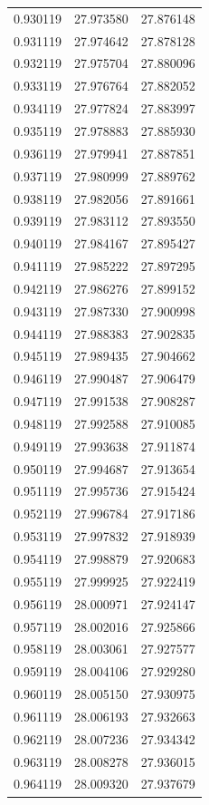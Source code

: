 \begin{tabular}{rrr}
0.930119 & 27.973580 & 27.876148 \\
0.931119 & 27.974642 & 27.878128 \\
0.932119 & 27.975704 & 27.880096 \\
0.933119 & 27.976764 & 27.882052 \\
0.934119 & 27.977824 & 27.883997 \\
0.935119 & 27.978883 & 27.885930 \\
0.936119 & 27.979941 & 27.887851 \\
0.937119 & 27.980999 & 27.889762 \\
0.938119 & 27.982056 & 27.891661 \\
0.939119 & 27.983112 & 27.893550 \\
0.940119 & 27.984167 & 27.895427 \\
0.941119 & 27.985222 & 27.897295 \\
0.942119 & 27.986276 & 27.899152 \\
0.943119 & 27.987330 & 27.900998 \\
0.944119 & 27.988383 & 27.902835 \\
0.945119 & 27.989435 & 27.904662 \\
0.946119 & 27.990487 & 27.906479 \\
0.947119 & 27.991538 & 27.908287 \\
0.948119 & 27.992588 & 27.910085 \\
0.949119 & 27.993638 & 27.911874 \\
0.950119 & 27.994687 & 27.913654 \\
0.951119 & 27.995736 & 27.915424 \\
0.952119 & 27.996784 & 27.917186 \\
0.953119 & 27.997832 & 27.918939 \\
0.954119 & 27.998879 & 27.920683 \\
0.955119 & 27.999925 & 27.922419 \\
0.956119 & 28.000971 & 27.924147 \\
0.957119 & 28.002016 & 27.925866 \\
0.958119 & 28.003061 & 27.927577 \\
0.959119 & 28.004106 & 27.929280 \\
0.960119 & 28.005150 & 27.930975 \\
0.961119 & 28.006193 & 27.932663 \\
0.962119 & 28.007236 & 27.934342 \\
0.963119 & 28.008278 & 27.936015 \\
0.964119 & 28.009320 & 27.937679 \\

\end{tabular}
